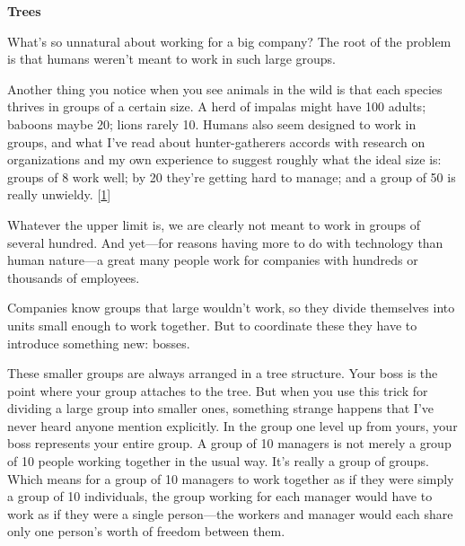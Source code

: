                     \textbf{Trees}

What's so unnatural about working
                    for a big company? The root of the problem is that humans
                    weren't meant to work in such large groups.

Another
                    thing you notice when you see animals in the wild is that
                    each species thrives in groups of a certain size. A herd of
                    impalas might have 100 adults; baboons maybe 20; lions
                    rarely 10. Humans also seem designed to work in groups, and
                    what I've read about hunter-gatherers accords with research
                    on organizations and my own experience to suggest roughly
                    what the ideal size is: groups of 8 work well; by 20 they're
                    getting hard to manage; and a group of 50 is really
                    unwieldy.
                    [\href{\#f1n}{1}]


                    Whatever the upper limit is, we are clearly not meant to
                    work in groups of several hundred. And yet---for reasons
                    having more to do with technology than human nature---a
                    great many people work for companies with hundreds or
                    thousands of employees.

Companies know groups
                    that large wouldn't work, so they divide themselves into
                    units small enough to work together. But to coordinate these
                    they have to introduce something new: bosses.

These
                    smaller groups are always arranged in a tree structure. Your
                    boss is the point where your group attaches to the tree. But
                    when you use this trick for dividing a large group into
                    smaller ones, something strange happens that I've never
                    heard anyone mention explicitly. In the group one level up
                    from yours, your boss represents your entire group. A group
                    of 10 managers is not merely a group of 10 people working
                    together in the usual way. It's really a group of groups.
                    Which means for a group of 10 managers to work together as
                    if they were simply a group of 10 individuals, the group
                    working for each manager would have to work as if they were
                    a single person---the workers and manager would each
                    share only one person's worth of freedom between them.

